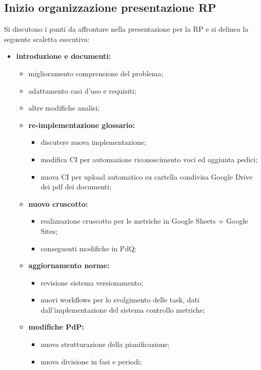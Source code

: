\subsection{Inizio organizzazione presentazione RP}
\label{rp}
Si discutono i punti da affrontare nella presentazione per la RP e si delinea la seguente scaletta esecutiva:
\begin{itemize}
    \item \textbf{introduzione e documenti:}
    \begin{itemize}
        \item miglioramento comprensione del problema;
        \item adattamento casi d'uso e requisiti;
        \item altre modifiche analisi;
        \item \textbf{re-implementazione glossario:}
        \begin{itemize}
            \item discutere nuova implementazione;
            \item modifica CI per automazione riconoscimento voci ed aggiunta pedici;
            \item nuova CI per upload automatico su cartella condivisa Google Drive dei pdf dei documenti;
        \end{itemize}
        \item \textbf{nuovo cruscotto:}
        \begin{itemize}
            \item realizzazione cruscotto per le metriche in Google Sheets + Google Sites;
            \item conseguenti modifiche in PdQ;
        \end{itemize}
        \item \textbf{aggiornamento norme:}
        \begin{itemize}
            \item revisione sistema versionamento;
            \item nuovi workflows per lo svolgimento delle task, dati dall'implementazione del sistema controllo metriche;
        \end{itemize}
        \item \textbf{modifiche PdP:}
        \begin{itemize}
            \item nuova strutturazione della pianificazione;
            \item nuova divisione in fasi e periodi;

\end{itemize}
\end{itemize}
\end{itemize}
